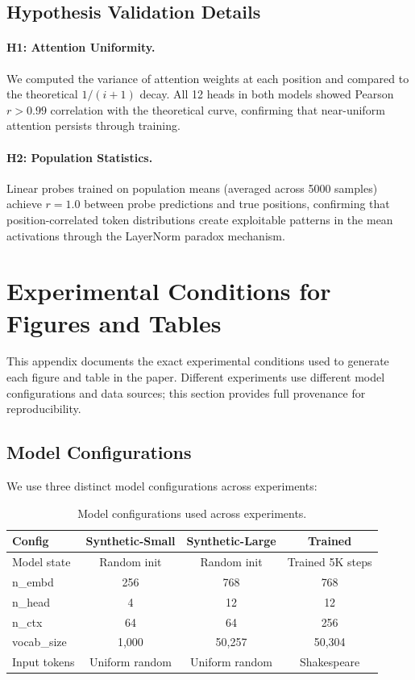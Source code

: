 \documentclass[11pt]{article}
\begin{document}
\subsection{Hypothesis Validation Details}

\paragraph{H1: Attention Uniformity.} We computed the variance of attention weights at each position and compared to the theoretical $1/(i+1)$ decay. All 12 heads in both models showed Pearson $r > 0.99$ correlation with the theoretical curve, confirming that near-uniform attention persists through training.

\paragraph{H2: Population Statistics.} Linear probes trained on population means (averaged across 5000 samples) achieve $r = 1.0$ between probe predictions and true positions, confirming that position-correlated token distributions create exploitable patterns in the mean activations through the LayerNorm paradox mechanism.

\section{Experimental Conditions for Figures and Tables}\label{app:experimental-conditions}

This appendix documents the exact experimental conditions used to generate each figure and table in the paper. Different experiments use different model configurations and data sources; this section provides full provenance for reproducibility.

\subsection{Model Configurations}

We use three distinct model configurations across experiments:

\begin{table}[htbp]
\centering
\small
\begin{tabular}{lccc}
\toprule
\textbf{Config} & \textbf{Synthetic-Small} & \textbf{Synthetic-Large} & \textbf{Trained} \\
\midrule
Model state & Random init & Random init & Trained 5K steps \\
n\_embd & 256 & 768 & 768 \\
n\_head & 4 & 12 & 12 \\
n\_ctx & 64 & 64 & 256 \\
vocab\_size & 1,000 & 50,257 & 50,304 \\
Input tokens & Uniform random & Uniform random & Shakespeare \\
\bottomrule
\end{tabular}
\caption{Model configurations used across experiments.}
\label{tab:model-configs}
\end{table}
\end{document}
